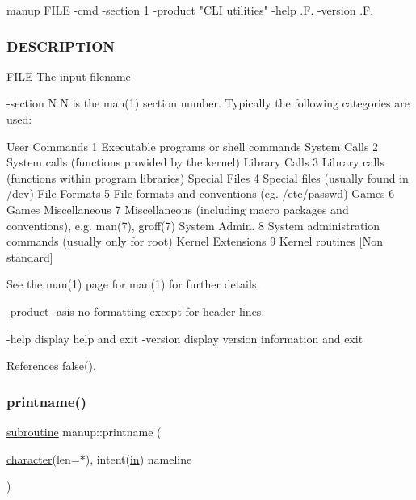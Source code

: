 \begin{DoxyVerb}manup FILE -cmd -section 1 -product "CLI utilities" -help .F. -version .F.
\end{DoxyVerb}


\subsubsection*{D\+E\+S\+C\+R\+I\+P\+T\+I\+ON}

F\+I\+LE The input filename

-\/section N N is the man(1) section number. Typically the following categories are used\+:

User Commands 1 Executable programs or shell commands System Calls 2 System calls (functions provided by the kernel) Library Calls 3 Library calls (functions within program libraries) Special Files 4 Special files (usually found in /dev) File Formats 5 File formats and conventions (eg. /etc/passwd) Games 6 Games Miscellaneous 7 Miscellaneous (including macro packages and conventions), e.\+g. man(7), groff(7) System Admin. 8 System administration commands (usually only for root) Kernel Extensions 9 Kernel routines \mbox{[}Non standard\mbox{]}

See the man(1) page for man(1) for further details.

-\/product -\/asis no formatting except for header lines.

-\/help display help and exit -\/version display version information and exit 

References false().

\mbox{\label{manup_8f90_a12de453acb5b104d198da168695af410}} 
\subsubsection{\texorpdfstring{printname()}{printname()}}
{\footnotesize\ttfamily \hyperlink{M__stopwatch_83_8txt_acfbcff50169d691ff02d4a123ed70482}{subroutine} manup\+::printname (\begin{DoxyParamCaption}\item[{\hyperlink{option__stopwatch_83_8txt_abd4b21fbbd175834027b5224bfe97e66}{character}(len=$\ast$), intent(\hyperlink{M__journal_83_8txt_afce72651d1eed785a2132bee863b2f38}{in})}]{nameline }\end{DoxyParamCaption})}



